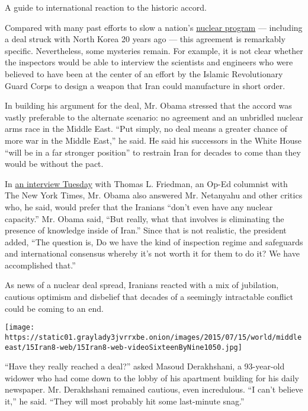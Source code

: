 A guide to international reaction to the historic accord.

Compared with many past efforts to slow a nation's
\href{http://topics.nytimes3xbfgragh.onion/top/news/international/countriesandterritories/iran/nuclear_program/index.html?inline=nyt-classifier}{nuclear
program} --- including a deal struck with North Korea 20 years ago ---
this agreement is remarkably specific. Nevertheless, some mysteries
remain. For example, it is not clear whether the inspectors would be
able to interview the scientists and engineers who were believed to have
been at the center of an effort by the Islamic Revolutionary Guard Corps
to design a weapon that Iran could manufacture in short order.

In building his argument for the deal, Mr. Obama stressed that the
accord was vastly preferable to the alternate scenario: no agreement and
an unbridled nuclear arms race in the Middle East. ``Put simply, no deal
means a greater chance of more war in the Middle East,'' he said. He
said his successors in the White House ``will be in a far stronger
position'' to restrain Iran for decades to come than they would be
without the pact.

In
\href{http://www.nytimes3xbfgragh.onion/2015/07/15/opinion/thomas-friedman-obama-makes-his-case-on-iran-nuclear-deal.html?hp\&action=click\&pgtype=Homepage\&module=b-lede-package-region\&region=top-news\&WT.nav=top-news}{an
interview Tuesday} with Thomas L. Friedman, an Op-Ed columnist with The
New York Times, Mr. Obama also answered Mr. Netanyahu and other critics
who, he said, would prefer that the Iranians ``don't even have any
nuclear capacity.'' Mr. Obama said, ``But really, what that involves is
eliminating the presence of knowledge inside of Iran.'' Since that is
not realistic, the president added, ``The question is, Do we have the
kind of inspection regime and safeguards and international consensus
whereby it's not worth it for them to do it? We have accomplished
that.''

As news of a nuclear deal spread, Iranians reacted with a mix of
jubilation, cautious optimism and disbelief that decades of a seemingly
intractable conflict could be coming to an end.

\texttt{[image: https://static01.graylady3jvrrxbe.onion/images/2015/07/15/world/middleeast/15Iran8-web/15Iran8-web-videoSixteenByNine1050.jpg]}

``Have they really reached a deal?'' asked Masoud Derakhshani, a
93-year-old widower who had come down to the lobby of his apartment
building for his daily newspaper. Mr. Derakhshani remained cautious,
even incredulous. ``I can't believe it,'' he said. ``They will most
probably hit some last-minute snag.''

